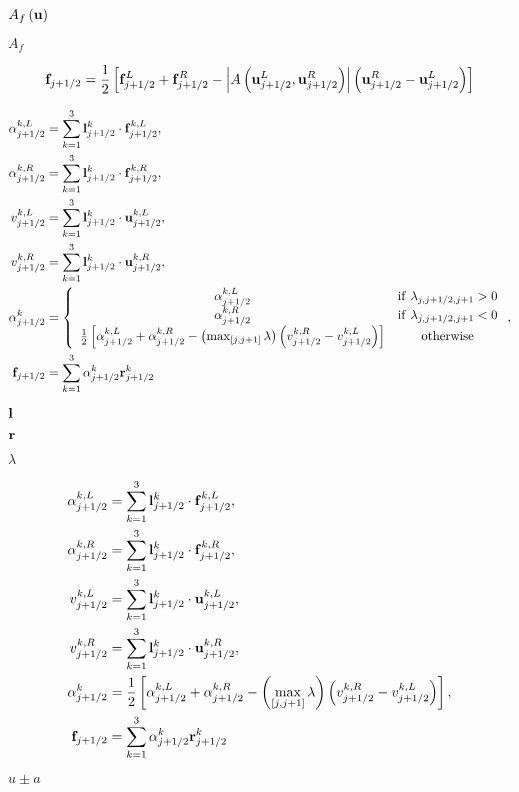 \documentclass{article}
\begin{document}
$A_f\left({\bf u}\right) $
\pagebreak

$A_f$
\pagebreak

\begin{equation} {\bf f}_{j+1/2} = \frac{1}{2}\left[ {\bf f}_{j+1/2}^L + {\bf f}_{j+1/2}^R - \left| A\left({\bf u}_{j+1/2}^L,{\bf u}_{j+1/2}^R\right) \right| \left( {\bf u}_{j+1/2}^R - {\bf u}_{j+1/2}^L \right)\right] \end{equation}
\pagebreak

\begin{align} \alpha_{j+1/2}^{k,L} &= \sum_{k=1}^3 {\bf l}_{j+1/2}^k \cdot {\bf f}_{j+1/2}^{k,L}, \\ \alpha_{j+1/2}^{k,R} &= \sum_{k=1}^3 {\bf l}_{j+1/2}^k \cdot {\bf f}_{j+1/2}^{k,R}, \\ v_{j+1/2}^{k,L} &= \sum_{k=1}^3 {\bf l}_{j+1/2}^k \cdot {\bf u}_{j+1/2}^{k,L}, \\ v_{j+1/2}^{k,R} &= \sum_{k=1}^3 {\bf l}_{j+1/2}^k \cdot {\bf u}_{j+1/2}^{k,R}, \\ \alpha_{j+1/2}^k &= \left\{ \begin{array}{cc} \alpha_{j+1/2}^{k,L} & {\rm if}\ \lambda_{j,j+1/2,j+1} > 0 \\ \alpha_{j+1/2}^{k,R} & {\rm if}\ \lambda_{j,j+1/2,j+1} < 0 \\ \frac{1}{2}\left[ \alpha_{j+1/2}^{k,L} + \alpha_{j+1/2}^{k,R} - \left(\max_{\left[j,j+1\right]} \lambda\right) \left( v_{j+1/2}^{k,R} - v_{j+1/2}^{k,L} \right) \right] & {\rm otherwise} \end{array}\right., \\ {\bf f}_{j+1/2} &= \sum_{k=1}^3 \alpha_{j+1/2}^k {\bf r}_{j+1/2}^k \end{align}
\pagebreak

${\bf l}$
\pagebreak

${\bf r}$
\pagebreak

$\lambda$
\pagebreak

\begin{align} \alpha_{j+1/2}^{k,L} &= \sum_{k=1}^3 {\bf l}_{j+1/2}^k \cdot {\bf f}_{j+1/2}^{k,L}, \\ \alpha_{j+1/2}^{k,R} &= \sum_{k=1}^3 {\bf l}_{j+1/2}^k \cdot {\bf f}_{j+1/2}^{k,R}, \\ v_{j+1/2}^{k,L} &= \sum_{k=1}^3 {\bf l}_{j+1/2}^k \cdot {\bf u}_{j+1/2}^{k,L}, \\ v_{j+1/2}^{k,R} &= \sum_{k=1}^3 {\bf l}_{j+1/2}^k \cdot {\bf u}_{j+1/2}^{k,R}, \\ \alpha_{j+1/2}^k &= \frac{1}{2}\left[ \alpha_{j+1/2}^{k,L} + \alpha_{j+1/2}^{k,R} - \left(\max_{\left[j,j+1\right]} \lambda\right) \left( v_{j+1/2}^{k,R} - v_{j+1/2}^{k,L} \right) \right], \\ {\bf f}_{j+1/2} &= \sum_{k=1}^3 \alpha_{j+1/2}^k {\bf r}_{j+1/2}^k \end{align}
\pagebreak

$ u\pm a$
\pagebreak
\end{document}
